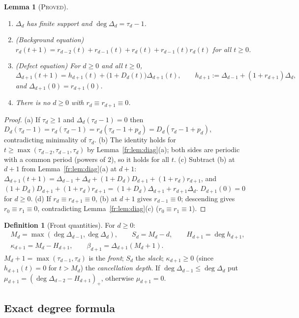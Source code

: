 \documentclass[11pt]{article}
\newtheorem{lemma}[theorem]{Lemma}
\theoremstyle{definition}
\newtheorem{definition}[theorem]{Definition}
\theoremstyle{remark}
\newcommand{\PROVED}{\textsc{Proved}}
\begin{document}
\begin{lemma}[\PROVED]\label{fr:lem:bgdef}
\begin{enumerate}
\item[(a)] $\Delta_d$ has finite support and $\deg\Delta_d=\tau_d-1$.
\item[(b)] (Background equation) $r_d(t+1)=r_{d-2}(t)+r_{d-1}(t)+r_d(t)+r_{d-1}(t)r_d(t)$ for all $t\ge0$.
\item[(c)] (Defect equation) For $d\ge0$ and all $t\ge0$,
\[
\Delta_{d+1}(t+1)=h_{d+1}(t)+\bigl(1+D_d(t)\bigr)\Delta_{d+1}(t),\qquad
h_{d+1}:=\Delta_{d-1}+(1+r_{d+1})\Delta_d ,
\]
and $\Delta_{d+1}(0)=r_{d+1}(0)$.
\item[(d)] There is no $d\ge0$ with $r_d\equiv r_{d+1}\equiv0$.
\end{enumerate}
\end{lemma}
\begin{proof}
(a) If $\tau_d\ge1$ and $\Delta_d(\tau_d-1)=0$ then
$D_d(\tau_d-1)=r_d(\tau_d-1)=r_d(\tau_d-1+p_d)=D_d(\tau_d-1+p_d)$, contradicting minimality of $\tau_d$.
(b) The identity holds for $t\ge\max(\tau_{d-2},\tau_{d-1},\tau_d)$ by Lemma~\ref{fr:lem:diag}(a); both sides are
periodic with a common period (powers of $2$), so it holds for all $t$.
(c) Subtract (b) at $d+1$ from Lemma~\ref{fr:lem:diag}(a) at $d+1$:
$\Delta_{d+1}(t+1)=\Delta_{d-1}+\Delta_d+(1+D_d)D_{d+1}+(1+r_d)r_{d+1}$, and
$(1+D_d)D_{d+1}+(1+r_d)r_{d+1}=(1+D_d)\Delta_{d+1}+r_{d+1}\Delta_d$.
$D_{d+1}(0)=0$ for $d\ge0$.
(d) If $r_d\equiv r_{d+1}\equiv0$, (b) at $d+1$ gives $r_{d-1}\equiv0$; descending gives
$r_0\equiv r_1\equiv0$, contradicting Lemma~\ref{fr:lem:diag}(c) ($r_0\equiv r_1\equiv1$).
\end{proof}

\begin{definition}[Front quantities]\label{fr:def:front}
For $d\ge0$:
\begin{gather*}
M_d=\max(\deg\Delta_{d-1},\deg\Delta_d),\qquad S_d=M_d-d,\qquad H_{d+1}=\deg h_{d+1},\\
\kappa_{d+1}=M_d-H_{d+1},\qquad \beta_{d+1}=\Delta_{d+1}(M_d+1).
\end{gather*}
$M_d+1=\max(\tau_{d-1},\tau_d)$ is the \emph{front}; $S_d$ the \emph{slack};
$\kappa_{d+1}\ge0$ (since $h_{d+1}(t)=0$ for $t>M_d$) the \emph{cancellation depth}.
If $\deg\Delta_{d-1}\le\deg\Delta_d$ put $\mu_{d+1}=(\deg\Delta_{d-2}-H_{d+1})_+$, otherwise $\mu_{d+1}=0$.
\end{definition}

\subsection{Exact degree formula}
\end{document}
